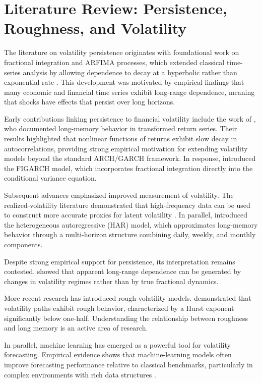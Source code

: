 \documentclass[12pt]{article}
\begin{document}
\section{Literature Review: Persistence, Roughness, and Volatility}
\label{sec:lit}

The literature on volatility persistence originates with foundational work on fractional integration and ARFIMA processes, which extended classical time-series analysis by allowing dependence to decay at a hyperbolic rather than exponential rate \citep{GrangerJoyeux1980, Hosking1981}. This development was motivated by empirical findings that many economic and financial time series exhibit long-range dependence, meaning that shocks have effects that persist over long horizons.

Early contributions linking persistence to financial volatility include the work of \citet{Ding1993}, who documented long-memory behavior in transformed return series. Their results highlighted that nonlinear functions of returns exhibit slow decay in autocorrelations, providing strong empirical motivation for extending volatility models beyond the standard ARCH/GARCH framework. In response, \citet{Baillie1996} introduced the FIGARCH model, which incorporates fractional integration directly into the conditional variance equation.

Subsequent advances emphasized improved measurement of volatility. The realized-volatility literature demonstrated that high-frequency data can be used to construct more accurate proxies for latent volatility \citep{Andersen2003, BarndorffNielsen2002}. In parallel, \citet{Corsi2009} introduced the heterogeneous autoregressive (HAR) model, which approximates long-memory behavior through a multi-horizon structure combining daily, weekly, and monthly components.

Despite strong empirical support for persistence, its interpretation remains contested. \citet{MikoschStarica2004} showed that apparent long-range dependence can be generated by changes in volatility regimes rather than by true fractional dynamics.

More recent research has introduced rough-volatility models. \citet{Gatheral2018} demonstrated that volatility paths exhibit rough behavior, characterized by a Hurst exponent significantly below one-half. Understanding the relationship between roughness and long memory is an active area of research.

In parallel, machine learning has emerged as a powerful tool for volatility forecasting. Empirical evidence shows that machine-learning models often improve forecasting performance relative to classical benchmarks, particularly in complex environments with rich data structures \citep{Gu2020}.
\end{document}
